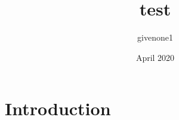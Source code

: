 \documentclass{article}
\title{test}
\author{givenone1 }
\date{April 2020}
\begin{document}
\maketitle

\section{Introduction}
\end{document}
